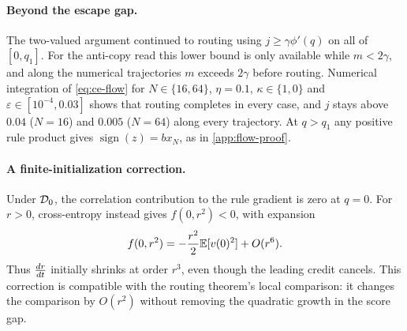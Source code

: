 \paragraph{Beyond the escape gap.}
The two-valued argument continued to routing using $j\ge\gamma\phi'(q)$ on all of $[0,q_1]$.
For the anti-copy read this lower bound is only available while $m<2\gamma$, and along the numerical trajectories $m$ exceeds $2\gamma$ before routing.
Numerical integration of \cref{eq:ce-flow} for $N\in\{16,64\}$, $\eta=0.1$, $\kappa\in\{1,0\}$ and $\varepsilon\in[10^{-4},0.03]$ shows that
routing completes in every case, and $j$ stays above $0.04$ ($N=16$) and $0.005$ ($N=64$) along every trajectory.
At $q>q_1$ any positive rule product gives $\operatorname{sign}(z)=b x_N$, as in \cref{app:flow-proof}.

\paragraph{A finite-initialization correction.}
Under $\mathcal D_{0}$, the correlation contribution to the rule gradient is zero at $q=0$.
For $r>0$, cross-entropy instead gives $f(0,r^2)<0$, with expansion
\[
 f(0,r^2)=-\frac{r^2}{2}\mathbb E[v(0)^2]+O(r^6).
\]
Thus $\frac{d r}{d t}$ initially shrinks at order $r^3$, even though the leading credit cancels.
This correction is compatible with the routing theorem's local comparison: it changes the comparison by $O(r^2)$ without removing the quadratic growth in the score gap.
